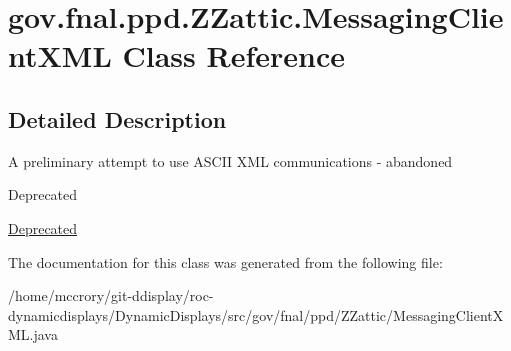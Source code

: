 \hypertarget{classgov_1_1fnal_1_1ppd_1_1ZZattic_1_1MessagingClientXML}{\section{gov.\-fnal.\-ppd.\-Z\-Zattic.\-Messaging\-Client\-X\-M\-L Class Reference}
\label{classgov_1_1fnal_1_1ppd_1_1ZZattic_1_1MessagingClientXML}
}


\subsection{Detailed Description}
A preliminary attempt to use A\-S\-C\-I\-I X\-M\-L communications -\/ abandoned \begin{DoxyRefDesc}{Deprecated}
\item[\hyperlink{deprecated__deprecated000018}{Deprecated}]\end{DoxyRefDesc}


The documentation for this class was generated from the following file\-:\begin{DoxyCompactItemize}
\item 
/home/mccrory/git-\/ddisplay/roc-\/dynamicdisplays/\-Dynamic\-Displays/src/gov/fnal/ppd/\-Z\-Zattic/Messaging\-Client\-X\-M\-L.\-java\end{DoxyCompactItemize}
